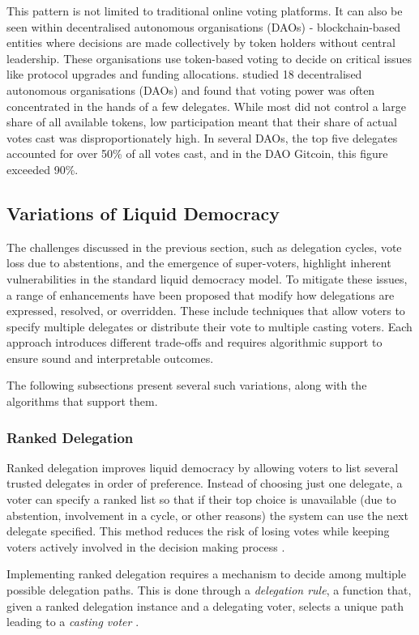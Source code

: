This pattern is not limited to traditional online voting platforms. It can also be seen within decentralised autonomous organisations (DAOs) - blockchain-based entities where decisions are made collectively by token holders without central leadership. These organisations use token-based voting to decide on critical issues like protocol upgrades and funding allocations. \cite{hallWhatHappensWhen2024} studied 18 decentralised autonomous organisations (DAOs) and found that voting power was often concentrated in the hands of a few delegates. While most did not control a large share of all available tokens, low participation meant that their share of actual votes cast was disproportionately high. In several DAOs, the top five delegates accounted for over 50\% of all votes cast, and in the DAO Gitcoin, this figure exceeded 90\%.

\subsection{Variations of Liquid Democracy}
The challenges discussed in the previous section, such as delegation cycles, vote loss due to abstentions, and the emergence of super-voters, highlight inherent vulnerabilities in the standard liquid democracy model. To mitigate these issues, a range of enhancements have been proposed that modify how delegations are expressed, resolved, or overridden. These include techniques that allow voters to specify multiple delegates or distribute their vote to multiple casting voters. Each approach introduces different trade-offs and requires algorithmic support to ensure sound and interpretable outcomes.

The following subsections present several such variations, along with the algorithms that support them.
\subsubsection{Ranked Delegation} Ranked delegation improves liquid democracy by allowing voters to list several trusted delegates in order of preference. Instead of choosing just one delegate, a voter can specify a ranked list so that if their top choice is unavailable (due to abstention, involvement in a cycle, or other reasons) the system can use the next delegate specified. This method reduces the risk of losing votes while keeping voters actively involved in the decision making process \citep{brill_liquid_2022}.

Implementing ranked delegation requires a mechanism to decide among multiple possible delegation paths. This is done through a \textit{delegation rule}, a function that, given a ranked delegation instance and a delegating voter, selects a unique path leading to a \textit{casting voter} \citep{brill_liquid_2022}.


